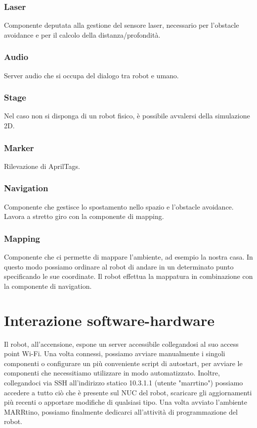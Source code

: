 \documentclass[italian, twoside]{sapthesis} %
\begin{document}
\subsubsection{Laser}
Componente deputata alla gestione del sensore laser, necessario per l'obstacle avoidance e per il calcolo della distanza/profondità.
\subsubsection{Audio}
Server audio che si occupa del dialogo tra robot e umano.
\subsubsection{Stage}
Nel caso non si disponga di un robot fisico, è possibile avvalersi della simulazione 2D.
\subsubsection{Marker}
Rilevazione di AprilTags.
\subsubsection{Navigation}
Componente che gestisce lo spostamento nello spazio e l'obstacle avoidance. Lavora a stretto giro con la componente di mapping.
\subsubsection{Mapping}
Componente che ci permette di mappare l'ambiente, ad esempio la nostra casa. In questo modo possiamo ordinare al robot di andare in un determinato punto specificando le sue coordinate. Il robot effettua la mappatura in combinazione con la componente di navigation.
\section{Interazione software-hardware}
Il robot, all'accensione, espone un server accessibile collegandosi al suo access point Wi-Fi. Una volta connessi, possiamo avviare manualmente i singoli componenti o configurare un più conveniente script di autostart, per avviare le componenti che necessitiamo utilizzare in modo automatizzato. Inoltre, collegandoci via SSH all'indirizzo statico 10.3.1.1 (utente "marrtino") possiamo accedere a tutto ciò che è presente sul NUC del robot, scaricare gli aggiornamenti più recenti o apportare modifiche di qualsiasi tipo. Una volta avviato l'ambiente MARRtino, possiamo finalmente dedicarci all'attività di programmazione del robot.
\end{document}
